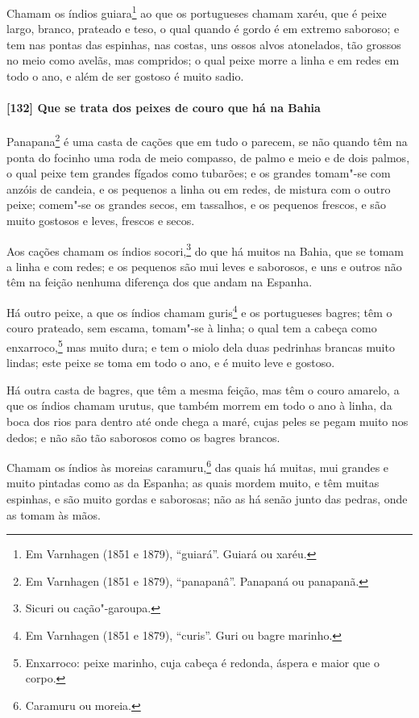 \begin{linenumbers}
Chamam os índios guiara\footnote{ Em Varnhagen (1851 e 1879), ``guiará''. Guiará ou
xaréu.} ao que os portugueses chamam xaréu, que é peixe largo, branco, prateado e teso, o
qual quando é gordo é em extremo saboroso; e tem nas pontas das espinhas, nas costas, uns
ossos alvos atonelados, tão grossos no meio como avelãs, mas compridos; o qual peixe morre
a linha e em redes em todo o ano, e além de ser gostoso é muito sadio.

\paragraph{[132] Que se trata dos peixes de couro que há na Bahia}\quad
Panapana\footnote{ Em Varnhagen (1851 e 1879), ``panapanâ''. Panapaná ou panapanã.} é uma
casta de cações que em tudo o parecem, se não quando têm na ponta do focinho uma roda de
meio compasso, de palmo e meio e de dois palmos, o qual peixe tem grandes fígados como
tubarões; e os grandes tomam"-se com anzóis de candeia, e os pequenos a linha ou em redes,
de mistura com o outro peixe; comem"-se os grandes secos, em tassalhos, e os pequenos
frescos, e são muito gostosos e leves, frescos e secos.

Aos cações chamam os índios socori,\footnote{ Sicuri ou cação"-garoupa.} do que há muitos
na Bahia, que se tomam a linha e com redes; e os pequenos são mui leves e saborosos, e uns
e outros não têm na feição nenhuma diferença dos que andam na Espanha.

Há outro peixe, a que os índios chamam guris\footnote{ Em Varnhagen (1851 e 1879),
``curis''. Guri ou bagre marinho.} e os portugueses bagres; têm o couro prateado, sem
escama, tomam"-se à linha; o qual tem a cabeça como enxarroco,\footnote{ Enxarroco: peixe
marinho, cuja cabeça é redonda, áspera e maior que o corpo.} mas muito dura; e tem o
miolo dela duas pedrinhas brancas muito lindas; este peixe se toma em todo o ano, e é
muito leve e gostoso.

Há outra casta de bagres, que têm a mesma feição, mas têm o couro amarelo, a que os índios
chamam urutus, que também morrem em todo o ano à linha, da boca dos rios para dentro até
onde chega a maré, cujas peles se pegam muito nos dedos; e não são tão saborosos como os
bagres brancos.

Chamam os índios às moreias caramuru,\footnote{ Caramuru ou moreia.} das quais há muitas,
mui grandes e muito pintadas como as da Espanha; as quais mordem muito, e têm muitas
espinhas, e são muito gordas e saborosas; não as há senão junto das pedras, onde as tomam
às mãos.


\end{linenumbers}
